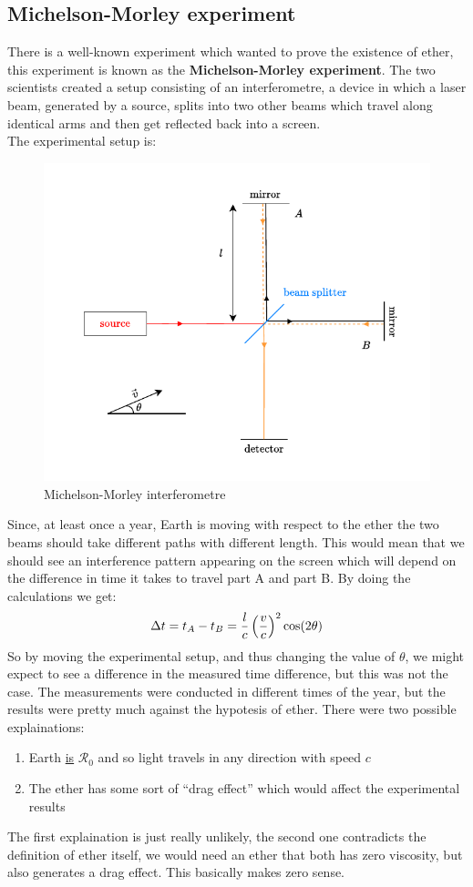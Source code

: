 \subsection{Michelson-Morley experiment}
There is a well-known experiment which wanted to prove the existence of ether, this experiment is known as the \textbf{Michelson-Morley experiment}. The two scientists created a setup consisting of an interferometre, a device in which a laser beam, generated by a source, splits into two other beams which travel along identical arms and then get reflected back into a screen.\\
The experimental setup is:
\begin{figure}[H]
  \centering
  \includegraphics[width=0.6\linewidth]{res/svg/michelson_morley_experiment.drawio}
  \caption{Michelson-Morley interferometre}
\end{figure}
Since, at least once a year, Earth is moving with respect to the ether the two beams should take different paths with different length. This would mean that we should see an interference pattern appearing on the screen which will depend on the difference in time it takes to travel part A and part B. By doing the calculations we get:
\begin{equation}
  \Delta t = t_A - t_B = \dfrac{l}{c}\left(\dfrac{v}{c}\right)^2\cos(2\theta)
\end{equation}
So by moving the experimental setup, and thus changing the value of $\theta$, we might expect to see a difference in the measured time difference, but this was not the case. The measurements were conducted in different times of the year, but the results were pretty much against the hypotesis of ether. There were two possible explainations:
\begin{enumerate}
  \item Earth \underline{is} $\mathcal{R}_0$ and so light travels in any direction with speed $c$
  \item The ether has some sort of ``drag effect'' which would affect the experimental results
\end{enumerate}
The first explaination is just really unlikely, the second one contradicts the definition of ether itself, we would need an ether that both has zero viscosity, but also generates a drag effect. This basically makes zero sense.
